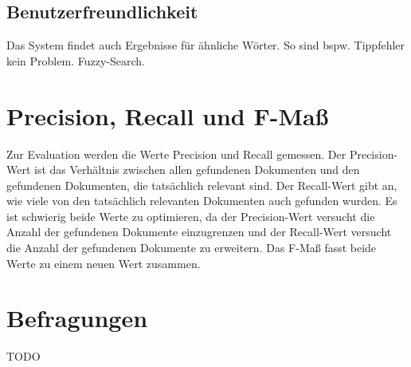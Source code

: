 \subsection*{Benutzerfreundlichkeit}
Das System findet auch Ergebnisse für ähnliche Wörter.
So sind bspw. Tippfehler kein Problem.
Fuzzy-Search.

\section{Precision, Recall und F-Maß}
Zur Evaluation werden die Werte Precision und Recall gemessen.
Der Precision-Wert ist das Verhältnis zwischen allen gefundenen Dokumenten und den gefundenen Dokumenten, die tatsächlich relevant sind.
Der Recall-Wert gibt an, wie viele von den tatsächlich relevanten Dokumenten auch gefunden wurden.
Es ist schwierig beide Werte zu optimieren, da der Precision-Wert versucht die Anzahl der gefundenen Dokumente einzugrenzen und der Recall-Wert versucht die Anzahl der gefundenen Dokumente zu erweitern.
Das F-Maß fasst beide Werte zu einem neuen Wert zusammen.

\section{Befragungen}
TODO